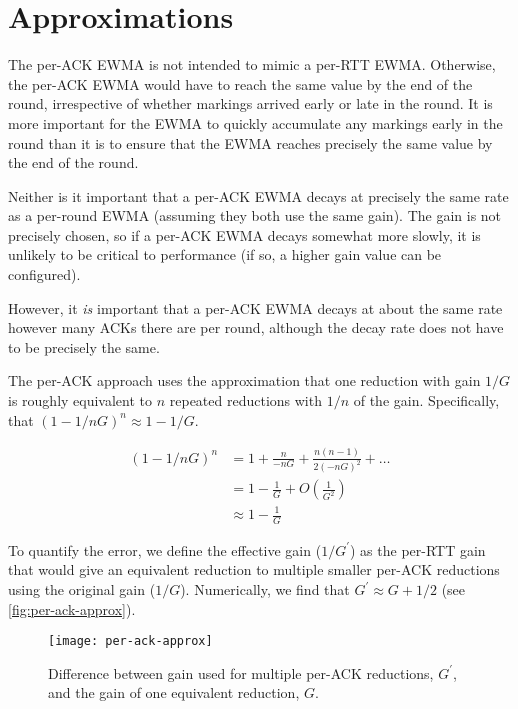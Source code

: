 \section{Approximations}\label{prresp_approx}

The per-ACK EWMA is not intended to mimic a per-RTT EWMA. Otherwise, the per-ACK
EWMA would have to reach the same value by the end of the round, irrespective of
whether markings arrived early or late in the round.
It is more important for the EWMA to quickly accumulate any markings early in
the round than it is to ensure that the EWMA reaches precisely the same value by
the end of the round. 

Neither is it important that a per-ACK EWMA decays at precisely the same rate as
a per-round EWMA (assuming they both use the same gain). The gain is not
precisely chosen, so if a per-ACK EWMA decays somewhat more slowly, it is
unlikely to be critical to performance (if so, a higher gain value can be
configured).

However, it \emph{is} important that a per-ACK EWMA decays at about the same
rate however many ACKs there are per round, although the decay rate does not
have to be precisely the same.

The per-ACK approach uses the approximation that one reduction with gain \(1/G\)
is roughly equivalent to \(n\) repeated reductions with \(1/n\) of the gain.
Specifically, that \((1 - 1/nG)^n \approx 1 - 1/G\).

\begin{align*}
(1 - 1/nG)^n &=       1 + \frac{n}{-nG} + \frac{n(n-1)}{2(-nG)^2} + \ldots \\
             &=       1 - \frac{1}{G} + O\left(\frac{1}{G^2}\right)\\
             &\approx 1 - \frac{1}{G}
\end{align*}

To quantify the error, we define the effective gain (\(1/G^\prime\)) as the
per-RTT gain that would give an equivalent reduction to multiple smaller per-ACK
reductions using the original gain (\(1/G\)). Numerically, we find that
\(G^\prime \approx G + 1/2\) (see \autoref{fig:per-ack-approx}).

\begin{figure}[h]
	\texttt{[image: per-ack-approx]}
	\caption{Difference between gain used for multiple per-ACK reductions, \(G^\prime\), and the gain of one equivalent reduction, \(G\).}
	\label{fig:per-ack-approx}
\end{figure}

